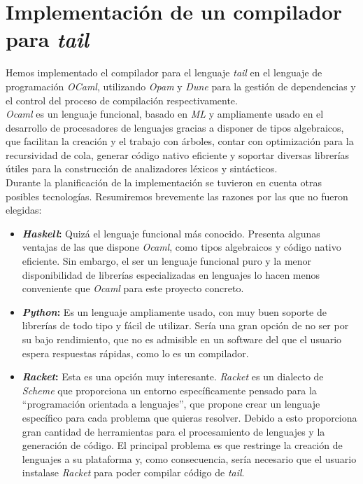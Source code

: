 \chapter{Implementación de un compilador para \textit{tail}}
\label{sect:impl}
Hemos implementado el compilador para el lenguaje \textit{tail} en el lenguaje de programación \textit{OCaml}, utilizando \textit{Opam} y \textit{Dune} para la gestión de dependencias y el control del proceso de compilación respectivamente.\\

\textit{Ocaml} es un lenguaje funcional, basado en \textit{ML} y ampliamente usado en el desarrollo de procesadores de lenguajes gracias a disponer de tipos algebraicos, que facilitan la creación y el trabajo con árboles, contar con optimización para la recursividad de cola, generar código nativo eficiente y soportar diversas librerías útiles para la construcción de analizadores léxicos y sintácticos.\\

Durante la planificación de la implementación se tuvieron en cuenta otras posibles tecnologías. Resumiremos brevemente las razones por las que no fueron elegidas:\\

\begin{itemize}
	\item \textbf{\textit{Haskell}:} Quizá el lenguaje funcional más conocido. Presenta algunas ventajas de las que dispone \textit{Ocaml}, como tipos algebraicos y código nativo eficiente. Sin embargo, el ser un lenguaje funcional puro y la menor disponibilidad de librerías especializadas en lenguajes lo hacen menos conveniente que \textit{Ocaml} para este proyecto concreto.\\
	
	\item \textbf{\textit{Python}:} Es un lenguaje ampliamente usado, con muy buen soporte de librerías de todo tipo y fácil de utilizar. Sería una gran opción de no ser por su bajo rendimiento, que no es admisible en un software del que el usuario espera respuestas rápidas, como lo es un compilador.\\
	
	\item \textbf{\textit{Racket}:} Esta es una opción muy interesante. \textit{Racket} es un dialecto de \textit{Scheme} que proporciona un entorno específicamente pensado para la ``programación orientada a lenguajes'', que propone crear un lenguaje específico para cada problema que quieras resolver. Debido a esto proporciona gran cantidad de herramientas para el procesamiento de lenguajes y la generación de código. El principal problema es que restringe la creación de lenguajes a su plataforma y, como consecuencia, sería necesario que el usuario instalase \textit{Racket} para poder compilar código de \textit{tail}.\\
\end{itemize}

